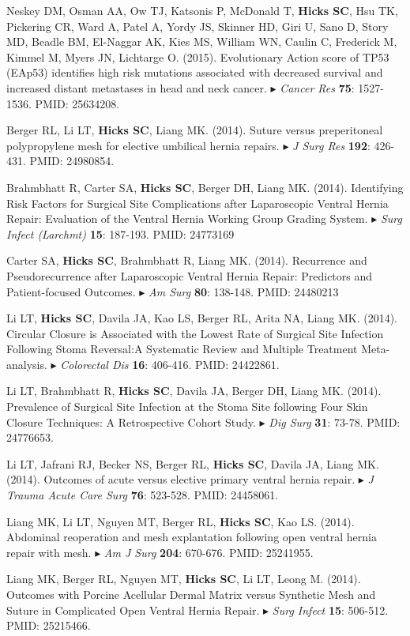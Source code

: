 \documentclass[10pt]{article}
\newcommand{\dg}[1]{{\color{black} $\blacktriangleright$ {#1}}}
\begin{document}
\item Neskey DM, Osman AA, Ow TJ, Katsonis P, McDonald T, {\bf Hicks SC}, Hsu TK, Pickering CR, Ward A, Patel A, Yordy JS, Skinner HD, Giri U, Sano D, Story MD, Beadle BM, El-Naggar AK, Kies MS, William WN, Caulin C, Frederick M, Kimmel M, Myers JN, Lichtarge O. (2015). Evolutionary Action score of TP53 (EAp53) identifies high risk mutations associated with decreased survival and increased distant metastases in head and neck cancer. \dg{{\it Cancer Res} {\bf 75}: 1527-1536. PMID: 25634208}.
\item Berger RL, Li LT, {\bf Hicks SC}, Liang MK. (2014). Suture versus preperitoneal polypropylene mesh for elective umbilical hernia repairs. \dg{{\it J Surg Res} {\bf 192}: 426-431. PMID: 24980854}.
\item Brahmbhatt R, Carter SA, {\bf Hicks SC}, Berger DH, Liang MK. (2014). Identifying Risk Factors for Surgical Site Complications after Laparoscopic Ventral Hernia Repair: Evaluation of the Ventral Hernia Working Group Grading System. \dg{{\it Surg Infect (Larchmt)} {\bf 15}: 187-193. PMID: 24773169}
\item Carter SA, {\bf Hicks SC}, Brahmbhatt R, Liang MK. (2014). Recurrence and Pseudorecurrence after Laparoscopic Ventral Hernia Repair: Predictors and Patient-focused Outcomes. \dg{{\it Am Surg} {\bf 80}: 138-148. PMID: 24480213}
\item Li LT, {\bf Hicks SC}, Davila JA, Kao LS, Berger RL, Arita NA, Liang MK. (2014). Circular Closure is Associated with the Lowest Rate of Surgical Site Infection Following Stoma Reversal:A Systematic Review and Multiple Treatment Meta-analysis. \dg{{\it Colorectal Dis} {\bf 16}: 406-416. PMID: 24422861}.
\item Li LT, Brahmbhatt R, {\bf Hicks SC}, Davila JA, Berger DH, Liang MK. (2014). Prevalence of Surgical Site Infection at the Stoma Site following Four Skin Closure Techniques: A Retrospective Cohort Study. \dg{{\it Dig Surg} {\bf 31}: 73-78. PMID: 24776653}.
\item Li LT, Jafrani RJ, Becker NS, Berger RL,  {\bf Hicks SC}, Davila JA, Liang MK. (2014). Outcomes of acute versus elective primary ventral hernia repair. \dg{{\it J Trauma Acute Care Surg} {\bf 76}: 523-528. PMID: 24458061}.
\item Liang MK, Li LT, Nguyen MT, Berger RL, {\bf Hicks SC}, Kao LS. (2014). Abdominal reoperation and mesh explantation following open ventral hernia repair with mesh. \dg{{\it Am J Surg} {\bf 204}: 670-676. PMID: 25241955}.
\item Liang MK, Berger RL, Nguyen MT, {\bf Hicks SC}, Li LT, Leong M. (2014). Outcomes with Porcine Acellular Dermal Matrix versus Synthetic Mesh and Suture in Complicated Open Ventral Hernia Repair. \dg{{\it Surg Infect} {\bf 15}: 506-512. PMID: 25215466}.
\end{document}
